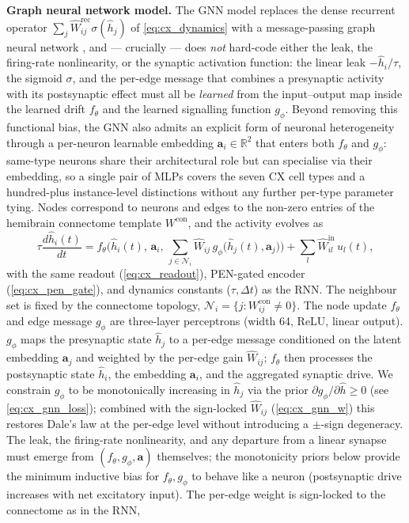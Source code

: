 \documentclass[11pt]{article}
\begin{document}
\bigskip
\noindent\textbf{Graph neural network model.}\label{method:GNN}
The GNN model replaces the dense recurrent operator $\sum_j \hat{W}^{\mathrm{rec}}_{ij}\sigma(\hat{h}_j)$ of \cref{eq:cx_dynamics} with a message-passing graph neural network \citep{gilmer_neural_2017}, and --- crucially --- does \emph{not} hard-code either the leak, the firing-rate nonlinearity, or the synaptic activation function: the linear leak $-\hat{h}_i/\tau$, the sigmoid $\sigma$, and the per-edge message that combines a presynaptic activity with its postsynaptic effect must all be \emph{learned} from the input--output map inside the learned drift $f_\theta$ and the learned signalling function $g_\phi$.
Beyond removing this functional bias, the GNN also admits an explicit form of neuronal heterogeneity through a per-neuron learnable embedding $\mathbf{a}_i\in\mathbb{R}^2$ that enters both $f_\theta$ and $g_\phi$: same-type neurons share their architectural role but can specialise via their embedding, so a single pair of MLPs covers the seven CX cell types and a hundred-plus instance-level distinctions without any further per-type parameter tying. Nodes correspond to neurons and edges to the non-zero entries of the hemibrain connectome template $W^{\mathrm{con}}$, and the activity evolves as
\begin{equation}
\tau\frac{d\hat{h}_i(t)}{dt} =
  f_\theta\!\Big(\hat{h}_i(t),\,\mathbf{a}_i,\,
       \sum_{j\in\mathcal{N}_i} \hat{W}_{ij}\,g_\phi\!\big(\hat{h}_j(t),\mathbf{a}_j\big)\Big)
  + \sum_l \hat{W}^{\mathrm{in}}_{il}\,u_l(t),
\label{eq:cx_gnn_dynamics}
\end{equation}
with the same readout (\cref{eq:cx_readout}), PEN-gated encoder (\cref{eq:cx_pen_gate}), and dynamics constants ($\tau,\Delta t$) as the RNN. The neighbour set is fixed by the connectome topology, $\mathcal{N}_i = \{j : W^{\mathrm{con}}_{ij}\neq 0\}$. The node update $f_\theta$ and edge message $g_\phi$ are three-layer perceptrons (width 64, ReLU, linear output). $g_\phi$ maps the presynaptic state $\hat{h}_j$ to a per-edge message conditioned on the latent embedding $\mathbf{a}_j$ and weighted by the per-edge gain $\hat{W}_{ij}$; $f_\theta$ then processes the postsynaptic state $\hat{h}_i$, the embedding $\mathbf{a}_i$, and the aggregated synaptic drive. We constrain $g_\phi$ to be monotonically increasing in $\hat{h}_j$ via the prior $\partial g_\phi/\partial \hat{h} \ge 0$ (see \cref{eq:cx_gnn_loss}); combined with the sign-locked $\hat{W}_{ij}$ (\cref{eq:cx_gnn_w}) this restores Dale's law at the per-edge level without introducing a $\pm$-sign degeneracy. The leak, the firing-rate nonlinearity, and any departure from a linear synapse must emerge from $(f_\theta, g_\phi, \mathbf{a})$ themselves; the monotonicity priors below provide the minimum inductive bias for $f_\theta, g_\phi$ to behave like a neuron (postsynaptic drive increases with net excitatory input). The per-edge weight is sign-locked to the connectome as in the RNN,
\end{document}
